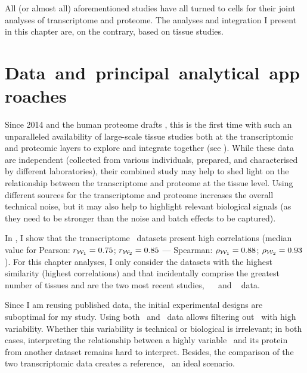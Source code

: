 All (or almost all) aforementioned studies have all turned to cells
for their joint analyses of transcriptome and proteome.
The analyses and integration I present in this chapter are,
on the contrary, based on tissue studies.

\vspace{-2mm}
\section{Data~and~principal~analytical~approaches}\label{sec:IntegrationData}
\vspace{-4mm}
Since 2014 and the human proteome drafts ,
this is the first time with such
an unparalleled availability of large-scale tissue studies
both at the transcriptomic and proteomic layers to explore and integrate together
(see ).
While these data are independent
(collected from various individuals, prepared,
and characterised by different laboratories),
their combined study may help
to shed light on the relationship
between the transcriptome and proteome at the tissue level.
Using different sources for the transcriptome and proteome
increases the overall technical noise,
but it may also help to highlight relevant biological signals (as
they need to be stronger than the noise and batch effects to be captured).

In , I show that
the transcriptome \Rnaseq\ datasets present high correlations
(median value for Pearson: $r_{\mathcal{W}_1}=0.75$; $r_{\mathcal{W}_2}=0.85$ ---
Spearman: $\rho_{\mathcal{W}_1}=0.88$; $\rho_{\mathcal{W}_2}=0.93$).
For this chapter analyses,
I only consider the datasets with the highest similarity
(highest correlations) and
that incidentally comprise the greatest number of tissues
and are the two most recent studies,
\ie\ ~
and ~ data.

Since I am reusing published data,
the initial experimental designs are suboptimal for my study.
Using both \uhlen\ and \gtex\ data
allows filtering out \mRNAs\ with high variability.
Whether this variability is technical or biological is irrelevant;
in both cases,
interpreting the relationship
between a highly variable \mRNAs\ and its protein from another dataset
remains hard to interpret.
Besides, the comparison of the two transcriptomic data creates a reference,
\ie\ an ideal scenario.

